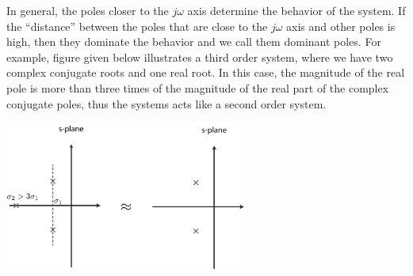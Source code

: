 \documentclass[twoside]{article}
\begin{document}
In general, the poles closer to the $j \omega$ axis determine the behavior of the system. If the ``distance''
between the poles that are close to the $j \omega$ axis and other poles is high, then they dominate the
behavior and we call them dominant poles. For example, figure given below illustrates a third order system,
where we have two complex conjugate roots and one real root. In this case, the magnitude of the real pole 
is more than three times of the magnitude of the real part of the complex conjugate poles, thus the systems acts like
a second order system. 

         \begin{minipage}[h]{1\linewidth}
    \begin{center}
     \includegraphics[width=0.6\textwidth]{third}
    \end{center}
  \end{minipage}

  
  

\end{document}
